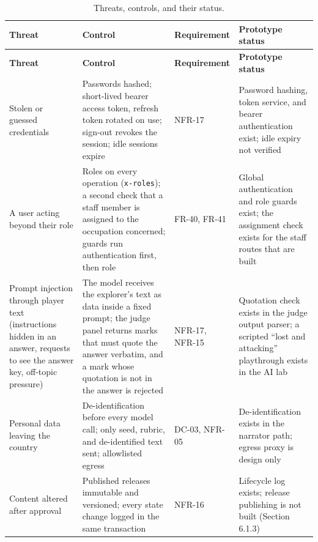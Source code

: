 {\small
\begin{longtable}{|>{\raggedright\arraybackslash}p{}|>{\raggedright\arraybackslash}p{}|>{\raggedright\arraybackslash}p{}|>{\raggedright\arraybackslash}p{}|}
\caption{Threats, controls, and their status.} \\
\hline
\textbf{Threat} & \textbf{Control} & \textbf{Requirement} & \textbf{Prototype status} \\ \hline
\endfirsthead
\hline
\textbf{Threat} & \textbf{Control} & \textbf{Requirement} & \textbf{Prototype status} \\ \hline
\endhead
Stolen or guessed credentials & Passwords hashed; short-lived bearer access token, refresh token rotated on use; sign-out revokes the session; idle sessions expire & NFR-17 & Password hashing, token service, and bearer authentication exist; idle expiry not verified \\ \hline
A user acting beyond their role & Roles on every operation (\texttt{x-\allowbreak{}roles}); a second check that a staff member is assigned to the occupation concerned; guards run authentication first, then role & FR-40, FR-41 & Global authentication and role guards exist; the assignment check exists for the staff routes that are built \\ \hline
Prompt injection through player text (instructions hidden in an answer, requests to see the answer key, off-topic pressure) & The model receives the explorer's text as data inside a fixed prompt; the judge panel returns marks that must quote the answer verbatim, and a mark whose quotation is not in the answer is rejected & NFR-17, NFR-15 & Quotation check exists in the judge output parser; a scripted ``lost and attacking'' playthrough exists in the AI lab \\ \hline
Personal data leaving the country & De-\allowbreak{}identification before every model call; only seed, rubric, and de-\allowbreak{}identified text sent; allowlisted egress & DC-03, NFR-05 & De-\allowbreak{}identification exists in the narrator path; egress proxy is design only \\ \hline
Content altered after approval & Published releases immutable and versioned; every state change logged in the same transaction & NFR-16 & Lifecycle log exists; release publishing is not built (Section 6.1.3) \\ \hline

\end{longtable}}
